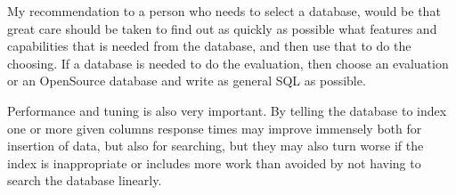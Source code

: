 My recommendation to a person who needs to select a database, would be
that great care should be taken to find out as quickly as possible
what features and capabilities that is needed from the database, and
then use that to do the choosing.  If a database is needed to do the
evaluation, then choose an evaluation or an OpenSource database and
write as general SQL as possible.

Performance and tuning is also very important.  By telling the
database to index one or more given columns response times may improve
immensely both for insertion of data, but also for searching, but they
may also turn worse if the index is inappropriate or includes more
work than avoided by not having to search the database linearly.





